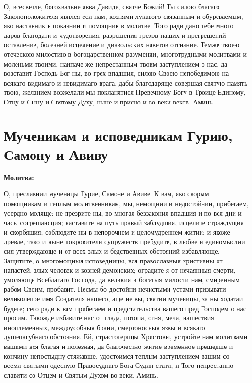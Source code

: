 О, всесветле, богохвальне авва Давиде, святче Божий! Ты силою благаго Законоположителя явился еси нам, кознями лукавого связанным и обуреваемым, яко наставник в покаянии и помощник в молитве. Того ради дано тебе много даров благодати и чудотворения, разрешения грехов наших и прегрешений оставление, болезней исцеление и диавольских наветов отгнание. Темже твоею отеческою милостию в богоцарственном разумении, многотрудными молитвами и моленьми твоими, наипаче же непрестанным твоим заступлением о нас, да возставит Господь Бог ны, во грех впадшия, силою Своею непобедимою на всякаго видимаго и невидимаго врага, дабы благодаряще совершая святую память твою, желанием возжелали мы покланятися Превечному Богу в Троице Единому, Отцу и Сыну и Святому Духу, ныне и присно и во веки веков. Аминь.



 

\section{Мученикам и исповедникам Гурию, Самону и Авиву}
 


\bfseries Молитва:\normalfont{}


О, преславнии мученицы Гурие, Самоне и Авиве! К вам, яко скорым помощникам и теплым молитвенникам, мы, немощнии и недостойнии, прибегаем, усердно моляще: не презрите ны, во многая беззакония впадшия и по вся дни и часы согрешающия; наставите на путь правый заблудшия, исцелите страждущия и скорбяшия; соблюдите ны в непорочнем и целомудреннем житии; и якоже древле, тако и ныне покровители супружеств пребудите, в любве и единомыслии сия утверждающе и от всех злых и бедственных обстояний избавляюще. Защитите, о многомощныя исповедницы, вся православныя христианы от напастей, злых человек и козней демонских; оградите я от нечаянныя смерти, умоляюще Всеблагаго Господа, да великия и богатыя милости нам, смиренным рабом Своим, пробавит. Несмы бо достойни нечистыми устами призывати великолепое имя Создателя нашего, аще не вы, святии мученицы, за ны ходатаи будете; сего ради к вам прибегаем и предстательства вашего пред Господем о нас просим. Такожде избавите нас от глада, потопа, огня, меча, нашествия иноплеменных, междоусобныя брани, смертоносныя язвы и всякаго душепагубнаго обстояния. Ей, страстотерпцы Христовы, устройте нам молитвами вашими вся благая и полезная, да благочестно житие временное прешедше и кончину непостыдну стяжавше, удостоимся теплым заступлением вашим со всеми святыми одесную Правосуднаго Бога Судии стати, и Того непрестанно славити со Отцем и Святым Духом во веки. Аминь.


